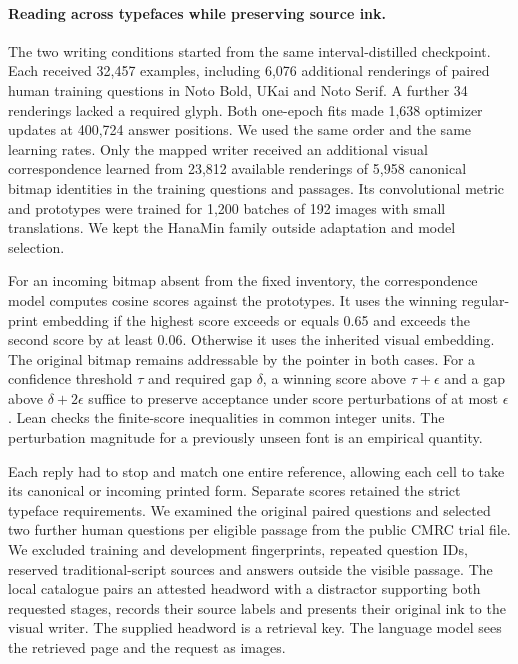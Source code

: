 \documentclass[12pt,a4paper]{article}
\providecommand{\DIFadd}[1]{{\protect\color{blue} \sf #1}} %
\begin{document}
\paragraph{\DIFadd{Reading across typefaces while preserving source ink.}}
\DIFadd{The two writing conditions started from the same interval-distilled checkpoint. Each received 32,457 examples, including 6,076 additional renderings of paired human training questions in Noto Bold, UKai and Noto Serif. A further 34 renderings lacked a required glyph. Both one-epoch fits made 1,638 optimizer updates at 400,724 answer positions. We used the same order and the same learning rates. Only the mapped writer received an additional visual correspondence learned from 23,812 available renderings of 5,958 canonical bitmap identities in the training questions and passages. Its convolutional metric and prototypes were trained for 1,200 batches of 192 images with small translations. We kept the HanaMin family outside adaptation and model selection.
}

\DIFadd{For an incoming bitmap absent from the fixed inventory, the correspondence model computes cosine scores against the prototypes. It uses the winning regular-print embedding if the highest score exceeds or equals 0.65 and exceeds the second score by at least 0.06. Otherwise it uses the inherited visual embedding. The original bitmap remains addressable by the pointer in both cases. For a confidence threshold $\tau$ and required gap $\delta$, a winning score above $\tau+\epsilon$ and a gap above $\delta+2\epsilon$ suffice to preserve acceptance under score perturbations of at most $\epsilon$. Lean checks the finite-score inequalities in common integer units. The perturbation magnitude for a previously unseen font is an empirical quantity.
}

\DIFadd{Each reply had to stop and match one entire reference, allowing each cell to take its canonical or incoming printed form. Separate scores retained the strict typeface requirements. We examined the original paired questions and selected two further human questions per eligible passage from the public CMRC trial file. We excluded training and development fingerprints, repeated question IDs, reserved traditional-script sources and answers outside the visible passage. The local catalogue pairs an attested headword with a distractor supporting both requested stages, records their source labels and presents their original ink to the visual writer. The supplied headword is a retrieval key. The language model sees the retrieved page and the request as images.
}
\end{document}
